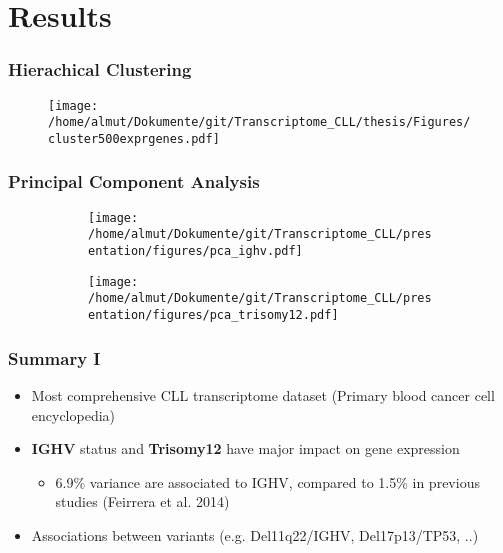 \documentclass[xcolor=dvipsnames,t,10pt]{beamer}
\begin{document}
\section{Results}
%
%
\begin{frame}[c]
	\frametitle{Hierachical Clustering}
	\begin{figure}
		\centering
		\texttt{[image: /home/almut/Dokumente/git/Transcriptome\_CLL/thesis/Figures/cluster500exprgenes.pdf]}
	\end{figure}
\end{frame}
%
%
\begin{frame}[c]
	\frametitle{Principal Component Analysis}
	\begin{figure}
		\centering
		\begin{subfigure}[t]{0.45\columnwidth}
		\texttt{[image: /home/almut/Dokumente/git/Transcriptome\_CLL/presentation/figures/pca\_ighv.pdf]}
		\end{subfigure}
		\hfill
		\begin{subfigure}[t]{0.45\columnwidth}
		\texttt{[image: /home/almut/Dokumente/git/Transcriptome\_CLL/presentation/figures/pca\_trisomy12.pdf]}
		\end{subfigure}
	\end{figure}
\end{frame}
% 
%
\begin{frame}[c]
	\frametitle{Summary I}	
	\begin{itemize}
		\item Most comprehensive CLL transcriptome dataset (Primary blood cancer cell encyclopedia)
		\item \textbf{IGHV} status and \textbf{Trisomy12} have major impact on gene expression
		\begin{itemize}
			\item 6.9\% variance are associated to IGHV, compared to 1.5\% in previous studies (Feirrera et al. 2014)
		\end{itemize}
		\item Associations between variants (e.g. Del11q22/IGHV, Del17p13/TP53, ..)
	\end{itemize}
\end{frame}
%
%
\end{document}
